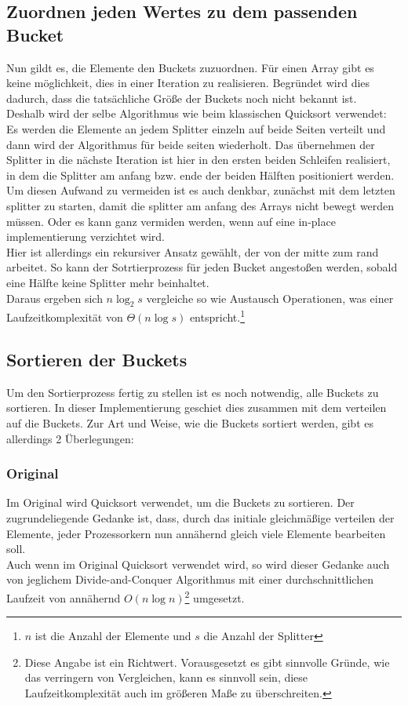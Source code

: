 	\subsection{Zuordnen jeden Wertes zu dem passenden Bucket}
		
		Nun gildt es, die Elemente den Buckets zuzuordnen.
		Für einen Array gibt es keine möglichkeit, dies in einer Iteration zu realisieren.
		Begründet wird dies dadurch, dass die tatsächliche Größe der Buckets noch nicht bekannt ist.\\
		Deshalb wird der selbe Algorithmus wie beim klassischen Quicksort verwendet:
		Es werden die Elemente an jedem Splitter einzeln auf beide Seiten verteilt und dann wird der Algorithmus für beide seiten wiederholt.
		Das übernehmen der Splitter in die nächste Iteration ist hier in den ersten beiden Schleifen realisiert, in dem die Splitter am anfang bzw. ende der beiden Hälften positioniert werden.
		Um diesen Aufwand zu vermeiden ist es auch denkbar, zunächst mit dem letzten splitter zu starten, damit die splitter am anfang des Arrays nicht bewegt werden müssen.
		Oder es kann ganz vermiden werden, wenn auf eine in-place implementierung verzichtet wird.\\
		Hier ist allerdings ein rekursiver Ansatz gewählt, der von der mitte zum rand arbeitet.
		So kann der Sotrtierprozess für jeden Bucket angestoßen werden, sobald eine Hälfte keine Splitter mehr beinhaltet.\\
		Daraus ergeben sich $n\log_2s$ vergleiche so wie Austausch Operationen, was einer Laufzeitkomplexität von $\Theta(n\log{s})$ entspricht.\footnote{$n$ ist die Anzahl der Elemente und $s$ die Anzahl der Splitter}

	\subsection{Sortieren der Buckets}
		Um den Sortierprozess fertig zu stellen ist es noch notwendig, alle Buckets zu sortieren.
		In dieser Implementierung geschiet dies zusammen mit dem verteilen auf die Buckets.
		Zur Art und Weise, wie die Buckets sortiert werden, gibt es allerdings 2 Überlegungen:
		\subsubsection{Original}
			Im Original \autocite{frazer-1970} wird Quicksort verwendet, um die Buckets zu sortieren.
			Der zugrundeliegende Gedanke ist, dass, durch das initiale gleichmäßige verteilen der Elemente, jeder Prozessorkern nun annähernd gleich viele Elemente bearbeiten soll.\\
			Auch wenn im Original Quicksort verwendet wird, so wird dieser Gedanke auch von jeglichem Divide-and-Conquer Algorithmus mit einer durchschnittlichen Laufzeit von annähernd $O(n\log{n})$\footnote{Diese Angabe ist ein Richtwert. Vorausgesetzt es gibt sinnvolle Gründe, wie das verringern von Vergleichen, kann es sinnvoll sein, diese Laufzeitkomplexität auch im größeren Maße zu überschreiten.} umgesetzt. 
